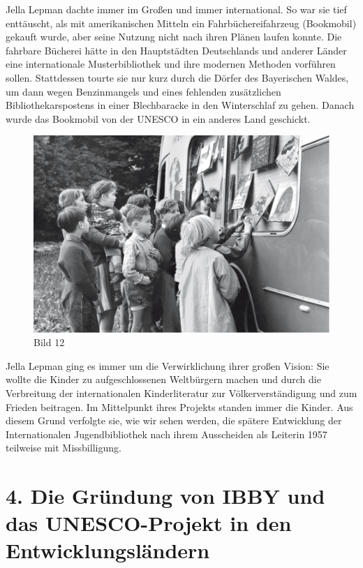 \documentclass[a4paper,
fontsize=11pt,
oneside,
numbers=noperiodatend,
parskip=half-,
bibliography=totoc,
final
]{scrartcl}
\begin{document}
Jella Lepman dachte immer im Großen und immer international. So war sie
tief enttäuscht, als mit amerikanischen Mitteln ein Fahrbüchereifahrzeug
(Bookmobil) gekauft wurde, aber seine Nutzung nicht nach ihren Plänen
laufen konnte. Die fahrbare Bücherei hätte in den Hauptstädten
Deutschlands und anderer Länder eine internationale Musterbibliothek und
ihre modernen Methoden vorführen sollen. Stattdessen tourte sie nur kurz
durch die Dörfer des Bayerischen Waldes, um dann wegen Benzinmangels und
eines fehlenden zusätzlichen Bibliothekarspostens in einer Blechbaracke
in den Winterschlaf zu gehen. Danach wurde das Bookmobil von der UNESCO
in ein anderes Land geschickt.

\begin{figure}[htbp]
\centering
\includegraphics{img/Bild12.jpg}
\caption{Bild 12}
\end{figure}

Jella Lepman ging es immer um die Verwirklichung ihrer großen Vision:
Sie wollte die Kinder zu aufgeschlossenen Weltbürgern machen und durch
die Verbreitung der internationalen Kinderliteratur zur
Völkerverständigung und zum Frieden beitragen. Im Mittelpunkt ihres
Projekts standen immer die Kinder. Aus diesem Grund verfolgte sie, wie
wir sehen werden, die spätere Entwicklung der Internationalen
Jugendbibliothek nach ihrem Ausscheiden als Leiterin 1957 teilweise mit
Missbilligung.

\section*{4. Die Gründung von IBBY und das UNESCO-Projekt in den
Entwicklungsländern}\label{die-gruxfcndung-von-ibby-und-das-unesco-projekt-in-den-entwicklungsluxe4ndern}
\end{document}
